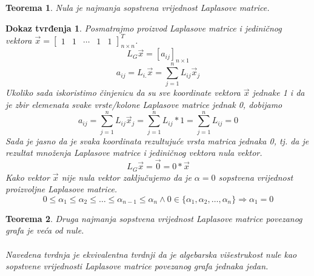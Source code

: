 \documentclass[11pt]{article}
\newtheorem{theorem}{Teorema}
\newtheorem*{custom_proof}{Dokaz tvrđenja}
\begin{document}
	\begin{theorem} Nula je najmanja sopstvena vrijednost Laplasove matrice.
	\end{theorem}
	
	\begin{custom_proof}
	Posmatrajmo proizvod Laplasove matrice i jediničnog vektora $\vec{x}=\begin{bmatrix} 1 & 1 & \cdots & 1 & 1  \end{bmatrix}^T_{n \times n}$.
	\[
	L_G\vec{x} = [a_{ij}]_{n \times 1}
	\]
	\[
		a_{ij} = L_{i.}\vec{x} = \sum_{j=1}^{n}L_{ij} \vec{x}_j 
	\]
	Ukoliko sada iskoristimo činjenicu da su sve koordinate vektora $\vec{x}$ jednake 1 i da je zbir elemenata svake vrste/kolone Laplasove matrice jednak 0, dobijamo
	\[
		a_{ij} = \sum_{j=1}^{n}L_{ij} \vec{x}_j = \sum_{j=1}^{n}L_{ij} * 1 = \sum_{j=1}^{n}L_{ij} = 0
	\]
	Sada je jasno da je svaka koordinata rezultujuće vrsta matrica jednaka 0, tj. da je rezultat množenja Laplasove matrice i jediničnog vektora nula vektor.
	\[
	L_G\vec{x} = \vec{0} = 0 * \vec{x}
	\]
	Kako vektor $\vec{x}$ nije nula vektor zaključujemo da je $\alpha = 0$ sopstvena vrijednost proizvoljne Laplasove matrice.
	\[
		0 \leq \alpha_1 \leq \alpha_2 \leq \dots \leq \alpha_{n-1} \leq \alpha_n \land 0 \in \{\alpha_1, \alpha_2, \dots, \alpha_n\} \Rightarrow \alpha_1 = 0
	\]
	\end{custom_proof}
	
	\begin{theorem} Druga najmanja sopstvena vrijednost Laplasove matrice povezanog grafa je veća od nule.
	\paragraph{}
	Navedena tvrdnja je ekvivalentna tvrdnji da je algebarska višestrukost nule kao sopstvene vrijednosti Laplasove matrice povezanog grafa jednaka jedan.
	\end{theorem}
	
\end{document}
